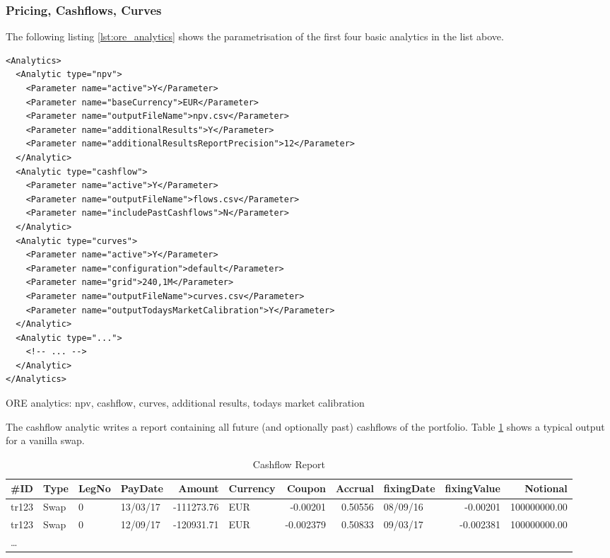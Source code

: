 {\subsubsection{Pricing, Cashflows, Curves}

The following listing \ref{lst:ore_analytics} shows the parametrisation of the first four basic analytics in
the list above.

\begin{listing}[H]
\begin{verbatim}
<Analytics>    
  <Analytic type="npv">
    <Parameter name="active">Y</Parameter>
    <Parameter name="baseCurrency">EUR</Parameter>
    <Parameter name="outputFileName">npv.csv</Parameter>
    <Parameter name="additionalResults">Y</Parameter>
    <Parameter name="additionalResultsReportPrecision">12</Parameter>
  </Analytic>      
  <Analytic type="cashflow">
    <Parameter name="active">Y</Parameter>
    <Parameter name="outputFileName">flows.csv</Parameter>
    <Parameter name="includePastCashflows">N</Parameter>
  </Analytic>      
  <Analytic type="curves">
    <Parameter name="active">Y</Parameter>
    <Parameter name="configuration">default</Parameter>
    <Parameter name="grid">240,1M</Parameter>
    <Parameter name="outputFileName">curves.csv</Parameter>
    <Parameter name="outputTodaysMarketCalibration">Y</Parameter>
  </Analytic>
  <Analytic type="...">
    <!-- ... -->
  </Analytic>      
</Analytics>      
\end{verbatim}
\caption{ORE analytics: npv, cashflow, curves, additional results, todays market calibration}
\label{lst:ore_analytics}
\end{listing}

The cashflow analytic writes a report containing all future (and optionally past) cashflows of the portfolio. Table \ref{cashflowreport} shows
a typical output for a vanilla swap.

\begin{table}[hbt]
\scriptsize
\begin{center}
  \begin{tabular}{l|l|l|l|r|l|r|r|l|r|r}
\hline
\#ID & Type & LegNo & PayDate & Amount & Currency & Coupon & Accrual & fixingDate & fixingValue & Notional \\
\hline
\hline
tr123 & Swap & 0 & 13/03/17 & -111273.76 & EUR & -0.00201 & 0.50556 & 08/09/16 & -0.00201 & 100000000.00 \\
tr123 & Swap & 0 & 12/09/17 & -120931.71 & EUR & -0.002379 & 0.50833 & 09/03/17 & -0.002381 & 100000000.00 \\
\ldots
\end{tabular}
\caption{Cashflow Report}
\label{cashflowreport}
\end{center}
\end{table}

}
